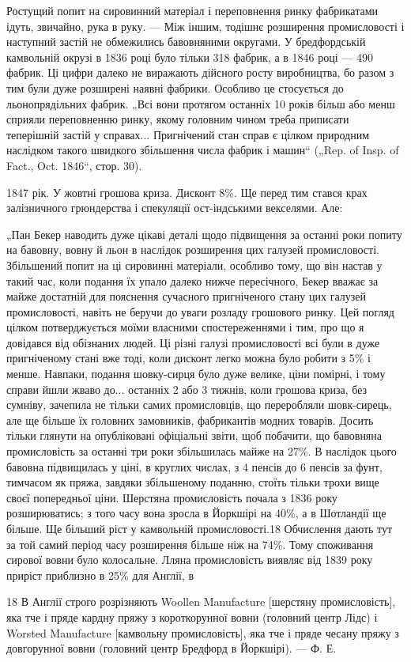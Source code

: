 Ростущий попит на сировинний матеріал і переповнення
ринку фабрикатами ідуть, звичайно, рука в руку. — Між іншим,
тодішнє розширення промисловості і наступний застій не обмежились
бавовняними округами. У бредфордській камвольній
окрузі в 1836 році було тільки 318 фабрик, а в 1846 році —
490 фабрик. Ці цифри далеко не виражають дійсного росту
виробництва, бо разом з тим були дуже розширені наявні фабрики.
Особливо це стосується до льонопрядільних фабрик. „Всі
вони протягом останніх 10 років більш або менш сприяли переповненню
ринку, якому головним чином треба приписати теперішній
застій у справах... Пригнічений стан справ є цілком природним
наслідком такого швидкого збільшення числа фабрик
і машин“ („Rep. of Insp. of Fact., Oct. 1846“, стор. 30).

1847 рік. У жовтні грошова криза. Дисконт 8\%. Ще перед
тим стався крах залізничного грюндерства і спекуляції ост-індськими
векселями. Але:

„Пан Бекер наводить дуже цікаві деталі щодо підвищення
за останні роки попиту на бавовну, вовну й льон в наслідок
розширення цих галузей промисловості. Збільшений попит на ці
сировинні матеріали, особливо тому, що він настав у такий час,
коли подання їх упало далеко нижче пересічного, Бекер вважає
за майже достатній для пояснення сучасного пригніченого стану
цих галузей промисловості, навіть не беручи до уваги розладу
грошового ринку. Цей погляд цілком потверджується моїми
власними спостереженнями і тим, про що я довідався від обізнаних
людей. Ці різні галузі промисловості всі були в дуже
пригніченому стані вже тоді, коли дисконт легко можна було
робити з 5\% і менше. Навпаки, подання шовку-сирця було дуже
велике, ціни помірні, і тому справи йшли жваво до... останніх
2 або 3 тижнів, коли грошова криза, без сумніву, зачепила не
тільки самих промисловців, що переробляли шовк-сирець, але
ще більше їх головних замовників, фабрикантів модних товарів.
Досить тільки глянути на опубліковані офіціальні звіти, щоб побачити,
що бавовняна промисловість за останні три роки збільшилась
майже на 27\%. В наслідок цього бавовна підвищилась
у ціні, в круглих числах, з 4 пенсів до 6 пенсів за фунт, тимчасом
як пряжа, завдяки збільшеному поданню, стоїть тільки
трохи вище своєї попередньої ціни. Шерстяна промисловість почала
з 1836 року розширюватись; з того часу вона зросла в
Йоркшірі на 40\%, а в Шотландії ще більше. Ще більший ріст
у камвольній промисловості.18 Обчислення дають тут за той
самий період часу розширення більше ніж на 74\%. Тому споживання
сирової вовни було колосальне. Лляна промисловість виявляє
від 1839 року приріст приблизно в 25\% для Англії, в

18 В Англії строго розрізняють Woollen Manufacture [шерстяну промисловість],
яка тче і пряде кардну пряжу з короткорунної вовни (головний центр Лідс)
і Worsted Manufacture [камвольну промисловість], яка тче і пряде чесану пряжу
з довгорунної вовни (головний центр Бредфорд в Йоркшірі). — Ф. Е.
